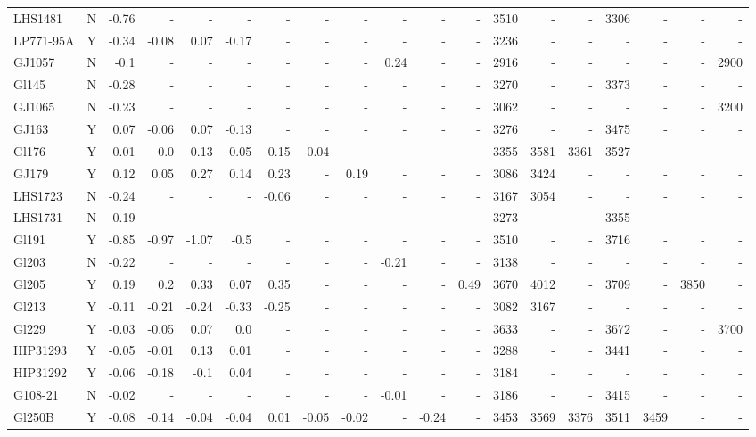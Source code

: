 \documentclass[referee]{aa}
\begin{document}
{\begin{landscape}
{\begin{longtable}{l c r r r r r r r r r r | r r r r r r r }
LHS1481 & N & -0.76 & - & - & - & - & - & - & - & - & - & 3510 & - & - & 3306 & - & - & - \\
LP771-95A & Y & -0.34 & -0.08 & 0.07 & -0.17 & - & - & - & - & - & - & 3236 & - & - & - & - & - & - \\
GJ1057 & N & -0.1 & - & - & - & - & - & - & 0.24 & - & - & 2916 & - & - & - & - & - & 2900 \\
Gl145 & N & -0.28 & - & - & - & - & - & - & - & - & - & 3270 & - & - & 3373 & - & - & - \\
GJ1065 & N & -0.23 & - & - & - & - & - & - & - & - & - & 3062 & - & - & - & - & - & 3200 \\
GJ163 & Y & 0.07 & -0.06 & 0.07 & -0.13 & - & - & - & - & - & - & 3276 & - & - & 3475 & - & - & - \\
Gl176 & Y & -0.01 & -0.0 & 0.13 & -0.05 & 0.15 & 0.04 & - & - & - & - & 3355 & 3581 & 3361 & 3527 & - & - & - \\
GJ179 & Y & 0.12 & 0.05 & 0.27 & 0.14 & 0.23 & - & 0.19 & - & - & - & 3086 & 3424 & - & - & - & - & - \\
LHS1723 & N & -0.24 & - & - & - & -0.06 & - & - & - & - & - & 3167 & 3054 & - & - & - & - & - \\
LHS1731 & N & -0.19 & - & - & - & - & - & - & - & - & - & 3273 & - & - & 3355 & - & - & - \\
Gl191 & Y & -0.85 & -0.97 & -1.07 & -0.5 & - & - & - & - & - & - & 3510 & - & - & 3716 & - & - & - \\
Gl203 & N & -0.22 & - & - & - & - & - & - & -0.21 & - & - & 3138 & - & - & - & - & - & - \\
Gl205 & Y & 0.19 & 0.2 & 0.33 & 0.07 & 0.35 & - & - & - & - & 0.49 & 3670 & 4012 & - & 3709 & - & 3850 & - \\
Gl213 & Y & -0.11 & -0.21 & -0.24 & -0.33 & -0.25 & - & - & - & - & - & 3082 & 3167 & - & - & - & - & - \\
Gl229 & Y & -0.03 & -0.05 & 0.07 & 0.0 & - & - & - & - & - & - & 3633 & - & - & 3672 & - & - & 3700 \\
HIP31293 & Y & -0.05 & -0.01 & 0.13 & 0.01 & - & - & - & - & - & - & 3288 & - & - & 3441 & - & - & - \\
HIP31292 & Y & -0.06 & -0.18 & -0.1 & 0.04 & - & - & - & - & - & - & 3184 & - & - & - & - & - & - \\
G108-21 & N & -0.02 & - & - & - & - & - & - & -0.01 & - & - & 3186 & - & - & 3415 & - & - & - \\
Gl250B & Y & -0.08 & -0.14 & -0.04 & -0.04 & 0.01 & -0.05 & -0.02 & - & -0.24 & - & 3453 & 3569 & 3376 & 3511 & 3459 & - & - \\

\end{longtable}}
\end{landscape}}
\end{document}
